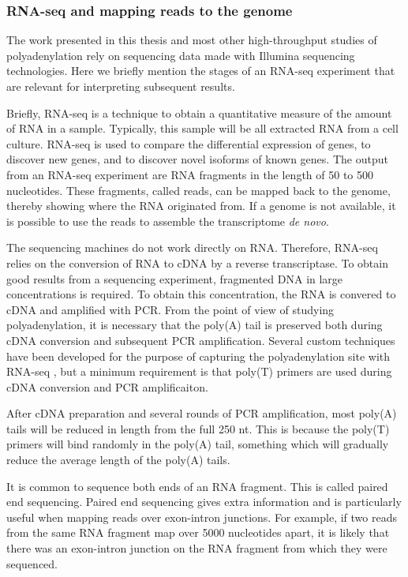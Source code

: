 %
\subsubsection{RNA-seq and mapping reads to the genome}
The work presented in this thesis and most other high-throughput studies of
polyadenylation rely on sequencing data made with Illumina sequencing
technologies. Here we briefly mention the stages of an RNA-seq
experiment that are relevant for interpreting subsequent results.

Briefly, RNA-seq is a technique to obtain a quantitative measure of the amount
of RNA in a sample. Typically, this sample will be all extracted RNA from a
cell culture. RNA-seq is used to compare the differential expression of
genes, to discover new genes, and to discover novel isoforms of known genes.
The output from an RNA-seq experiment are RNA fragments in the length of
50 to 500 nucleotides. These fragments, called reads, can be mapped back to the
genome, thereby showing where the RNA originated from. If a genome is not
available, it is possible to use the reads to assemble the transcriptome
\textit{de novo}.

The sequencing machines do not work directly on RNA. Therefore, RNA-seq relies
on the conversion of RNA to cDNA by a reverse transcriptase. To obtain good
results from a sequencing experiment, fragmented DNA in large concentrations is
required. To obtain this concentration, the RNA is convered to cDNA and
amplified with PCR. From the point of view of studying polyadenylation,
it is necessary that the poly(A) tail is preserved both during cDNA conversion
and subsequent PCR amplification. Several custom techniques have been developed
for the purpose of capturing the polyadenylation site with RNA-seq
\cite{ozsolak_comprehensive_2010, derti_quantitative_2012}, but a minimum
requirement is that poly(T) primers are used during cDNA conversion and PCR
amplificaiton.

After cDNA preparation and several rounds of PCR amplification, most poly(A)
tails will be reduced in length from the full 250 nt. This is because the
poly(T) primers will bind randomly in the poly(A) tail, something which will
gradually reduce the average length of the poly(A) tails.

It is common to sequence both ends of an RNA fragment. This is called paired
end sequencing. Paired end sequencing gives extra information and is
particularly useful when mapping reads over exon-intron junctions. For example,
if two reads from the same RNA fragment map over 5000 nucleotides apart, it is
likely that there was an exon-intron junction on the RNA fragment from which
they were sequenced.

